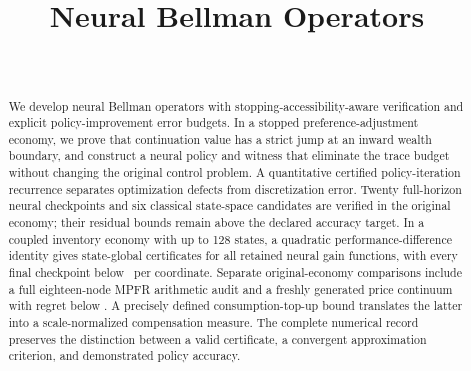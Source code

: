 \documentclass[ecta]{econsocart}
\theoremstyle{remark}
\begin{document}
\begin{frontmatter}
\title{Neural Bellman Operators}
\begin{aug}
\author[id=au1,addressref={add1}]{~}
\address[id=add1]{}
\end{aug}
\begin{abstract}
We develop neural Bellman operators with stopping-accessibility-aware verification and explicit policy-improvement error budgets. In a stopped preference-adjustment economy, we prove that continuation value has a strict jump at an inward wealth boundary, and construct a neural policy and witness that eliminate the trace budget without changing the original control problem. A quantitative certified policy-iteration recurrence separates optimization defects from discretization error. Twenty full-horizon neural checkpoints and six classical state-space candidates are verified in the original economy; their residual bounds remain above the declared accuracy target. In a coupled inventory economy with up to 128 states, a quadratic performance-difference identity gives state-global certificates for all retained neural gain functions, with every final checkpoint below \RInventoryFinalMax\ per coordinate. Separate original-economy comparisons include a full eighteen-node MPFR arithmetic audit and a freshly generated price continuum with regret below \RFreshGap. A precisely defined consumption-top-up bound translates the latter into a scale-normalized compensation measure. The complete numerical record preserves the distinction between a valid certificate, a convergent approximation criterion, and demonstrated policy accuracy.
\end{abstract}
\begin{keyword}
\end{keyword}
\end{frontmatter}

\begin{appendix}


\end{appendix}
\clearpage

\end{document}
